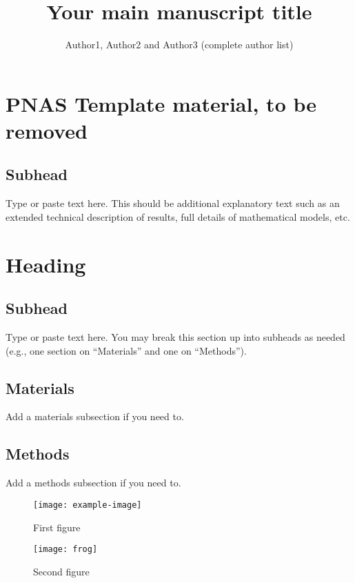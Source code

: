 \documentclass[9pt,twoside,lineno]{pnas-new}
\title{Your main manuscript title}
\author{Author1, Author2 and Author3 (complete author list)}
\begin{document}
\instructionspage  

\maketitle

\SItext


\section*{PNAS Template material, to be removed}

\subsection*{Subhead}
Type or paste text here. This should be additional explanatory text such as an extended technical description of results, full details of mathematical models, etc.   

\section*{Heading}
\subsection*{Subhead}
Type or paste text here. You may break this section up into subheads as needed (e.g., one section on ``Materials'' and one on ``Methods'').

\subsection*{Materials}
Add a materials subsection if you need to.

\subsection*{Methods}
Add a methods subsection if you need to.


\begin{figure}
\centering
\texttt{[image: example-image]}
\caption{First figure}
\end{figure}

\begin{figure}
\centering
\texttt{[image: frog]}
\caption{Second figure}
\end{figure}
\end{document}
